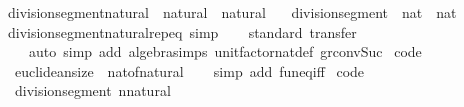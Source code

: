 \begin{isabellebody}
\isanewline
{}\isamarkupfalse%
\ division{\isacharunderscore}{\kern0pt}segment{\isacharunderscore}{\kern0pt}natural\ {\isacharcolon}{\kern0pt}{\isacharcolon}{\kern0pt}\ {\isachardoublequoteopen}natural\ {\isasymRightarrow}\ natural{\isachardoublequoteclose}\isanewline
\ \ \ {\isachardoublequoteopen}division{\isacharunderscore}{\kern0pt}segment\ {\isacharcolon}{\kern0pt}{\isacharcolon}{\kern0pt}\ nat\ {\isasymRightarrow}\ nat{\isachardoublequoteclose}\isanewline
%
\isadelimproof
\ \ %
\endisadelimproof
%
\isatagproof
\isacommand{{\isachardot}{\kern0pt}}\isamarkupfalse%
%
\endisatagproof
{\isafoldproof}%
%
\isadelimproof
\isanewline
%
\endisadelimproof
\isanewline
{}\isamarkupfalse%
\ division{\isacharunderscore}{\kern0pt}segment{\isacharunderscore}{\kern0pt}natural{\isachardot}{\kern0pt}rep{\isacharunderscore}{\kern0pt}eq\ {\isacharbrackleft}{\kern0pt}simp{\isacharbrackright}{\kern0pt}\isanewline
\isanewline
{}\isamarkupfalse%
\isanewline
%
\isadelimproof
\ \ %
\endisadelimproof
%
\isatagproof
{}\isamarkupfalse%
\ {\isacharparenleft}{\kern0pt}standard{\isacharsemicolon}{\kern0pt}\ transfer{\isacharparenright}{\kern0pt}\isanewline
\ \ \ \ {\isacharparenleft}{\kern0pt}auto\ simp\ add{\isacharcolon}{\kern0pt}\ algebra{\isacharunderscore}{\kern0pt}simps\ unit{\isacharunderscore}{\kern0pt}factor{\isacharunderscore}{\kern0pt}nat{\isacharunderscore}{\kern0pt}def\ gr{}{\isacharunderscore}{\kern0pt}conv{\isacharunderscore}{\kern0pt}Suc{\isacharparenright}{\kern0pt}%
\endisatagproof
{\isafoldproof}%
%
\isadelimproof
\isanewline
%
\endisadelimproof
\isanewline
{}\isamarkupfalse%
\isanewline
\isanewline
{}\isamarkupfalse%
\ {\isacharbrackleft}{\kern0pt}code{\isacharbrackright}{\kern0pt}{\isacharcolon}{\kern0pt}\isanewline
\ \ {\isachardoublequoteopen}euclidean{\isacharunderscore}{\kern0pt}size\ {\isacharequal}{\kern0pt}\ nat{\isacharunderscore}{\kern0pt}of{\isacharunderscore}{\kern0pt}natural{\isachardoublequoteclose}\isanewline
%
\isadelimproof
\ \ %
\endisadelimproof
%
\isatagproof
{}\isamarkupfalse%
\ {\isacharparenleft}{\kern0pt}simp\ add{\isacharcolon}{\kern0pt}\ fun{\isacharunderscore}{\kern0pt}eq{\isacharunderscore}{\kern0pt}iff{\isacharparenright}{\kern0pt}%
\endisatagproof
{\isafoldproof}%
%
\isadelimproof
\isanewline
%
\endisadelimproof
\isanewline
{}\isamarkupfalse%
\ {\isacharbrackleft}{\kern0pt}code{\isacharbrackright}{\kern0pt}{\isacharcolon}{\kern0pt}\isanewline
\ \ {\isachardoublequoteopen}division{\isacharunderscore}{\kern0pt}segment\ {\isacharparenleft}{\kern0pt}n{\isacharcolon}{\kern0pt}{\isacharcolon}{\kern0pt}natural{\isacharparenright}{\kern0pt}\ {\isacharequal}{\kern0pt}\ {}{\isachardoublequoteclose}\isanewline

\end{isabellebody}
